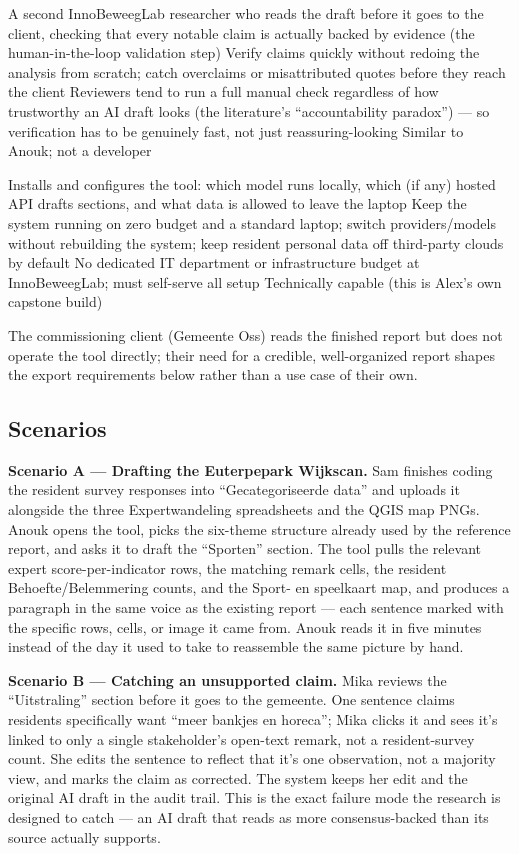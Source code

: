 {A second InnoBeweegLab researcher who reads the draft before it goes to the client, checking that every notable claim is actually backed by evidence (the human-in-the-loop validation step)}
{Verify claims quickly without redoing the analysis from scratch; catch overclaims or misattributed quotes before they reach the client}
{Reviewers tend to run a full manual check regardless of how trustworthy an AI draft looks (the literature's ``accountability paradox'') --- so verification has to be genuinely fast, not just reassuring-looking}
{Similar to Anouk; not a developer}

{Installs and configures the tool: which model runs locally, which (if any) hosted API drafts sections, and what data is allowed to leave the laptop}
{Keep the system running on zero budget and a standard laptop; switch providers/models without rebuilding the system; keep resident personal data off third-party clouds by default}
{No dedicated IT department or infrastructure budget at InnoBeweegLab; must self-serve all setup}
{Technically capable (this is Alex's own capstone build)}

The commissioning client (Gemeente Oss) reads the finished report but does not operate the tool directly; their need for a credible, well-organized report shapes the export requirements below rather than a use case of their own.

\subsection{Scenarios}

\textbf{Scenario A --- Drafting the Euterpepark Wijkscan.} Sam finishes coding the resident survey responses into ``Gecategoriseerde data'' and uploads it alongside the three Expertwandeling spreadsheets and the QGIS map PNGs. Anouk opens the tool, picks the six-theme structure already used by the reference report, and asks it to draft the ``Sporten'' section. The tool pulls the relevant expert score-per-indicator rows, the matching remark cells, the resident Behoefte/Belemmering counts, and the Sport- en speelkaart map, and produces a paragraph in the same voice as the existing report --- each sentence marked with the specific rows, cells, or image it came from. Anouk reads it in five minutes instead of the day it used to take to reassemble the same picture by hand.

\textbf{Scenario B --- Catching an unsupported claim.} Mika reviews the ``Uitstraling'' section before it goes to the gemeente. One sentence claims residents specifically want ``meer bankjes en horeca''; Mika clicks it and sees it's linked to only a single stakeholder's open-text remark, not a resident-survey count. She edits the sentence to reflect that it's one observation, not a majority view, and marks the claim as corrected. The system keeps her edit and the original AI draft in the audit trail. This is the exact failure mode the research is designed to catch --- an AI draft that reads as more consensus-backed than its source actually supports.

